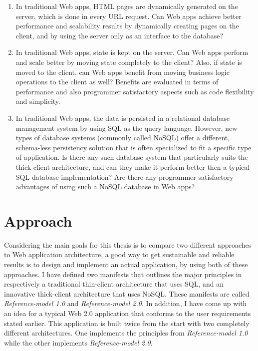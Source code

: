 \begin{enumerate}
\item{} In traditional Web apps, HTML pages are dynamically generated on the server, which is done in every URL request. Can Web apps achieve better performance and scalability results by dynamically creating pages on the client, and by using the server only as an interface to the database? 
\item{} In traditional Web apps, state is kept on the server. Can Web apps perform and scale better by moving state completely to the client? Also, if state is moved to the client, can Web apps benefit from moving business logic operations to the client as well? Benefits are evaluated in terms of performance and also programmer satisfactory aspects such as code flexibility and simplicity. 
\item{} In traditional Web apps, the data is persisted in a relational database management system by using SQL as the query language. However, new types of database systems (commonly called NoSQL) offer a different, schema-less persistency solution that is often specialized to fit a specific type of application. Is there any such database system that particularly  suits the thick-client architecture, and can they make it perform better then a typical SQL database implementation? Are there any programmer satisfactory advantages of using such a NoSQL database in Web apps? 
\end{enumerate}


\section{Approach}
Considering the main goals for this thesis is to compare two different approaches to Web application architecture, a good way to get sustainable and reliable results is to design and implement an actual application, by using both of these approaches. I have defined two manifests that outlines the major principles in respectively a traditional thin-client architecture that uses SQL, and an innovative thick-client architecture that uses NoSQL. These manifests are called \textit{Reference-model 1.0} and \textit{Reference-model 2.0}. In addition, I have come up with an idea for a typical Web 2.0 application that conforms to the user requirements stated earlier. This  application is built twice from the start with two completely different architectures. One implements the principles from \textit{Reference-model 1.0} while the other implements \textit{Reference-model 2.0}. 

